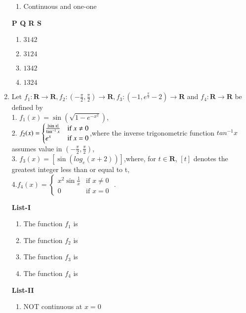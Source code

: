 \documentclass[journal,12pt,twocolumn]{IEEEtran}
\theoremstyle{remark}
\begin{document}
\begin{enumerate}
\begin{multicols}{2}
\begin{enumerate}[label=\arabic*.]
					\item  Continuous and one-one
				\end{enumerate}
		\end{multicols}
			\textbf{   P Q R S}
			\begin{enumerate}[label=(\alph*)]
				\item $ 3 1 4 2$
				\item$ 3 1 2 4$
				\item $1 3 4 2$ 
				\item $1 3 2 4$
			\end{enumerate}
            \item Let $f_1: \textbf{R}\to \textbf{R},f_2:(-\frac{\pi}{2},\frac{\pi}{2})\to \textbf{R}, f_3:(-1,e^\frac{\pi}{2}-2)\to \textbf{R}$ and $f_4: \textbf{R}\to \textbf{R}$ be defined by \\
            1. $f_1(x)=\sin({\sqrt{1-e^{-x^2}}})$, \\
            2. $f_2(x) =
             \begin{cases}
		 \frac{\left\vert\sin{x}\right\vert}{\tan^{-1}x} & \text{if } x \neq 0 \\
                 e^x & \text{if } x = 0 
                 \end{cases}$,where the inverse trigonometric function $tan^{-1}x $ assumes value in $(-\frac{\pi}{2},\frac{\pi}{2})$,\\
            3. $f_3(x)=[\sin({log_e(x+2)})]$,where, for $t\in \textbf{R}$, $[t]$ denotes the greatest integer less than or equal to t, \\
            4.$f_4(x) =
        \begin{cases}
                 x^2\sin{\frac{1}{x}} & \text{if } x \neq 0 \\
                 0 & \text{if } x = 0 
                 \end{cases}$ .
                 \begin{multicols}{2} 
				\textbf{List-I} 
				\begin{enumerate}[label=\Alph*., start=16]
					\item The function $f_1$ is
					\item The function $f_2$ is 
					\item The function $f_3$ is 
					\item The function $f_4$ is
				\end{enumerate}
				\columnbreak
				\textbf{List-II}
				\begin{enumerate}[label=\arabic*.]
					\item  NOT continuous at $x = 0$ 

\end{enumerate}
\end{multicols}
\end{enumerate}
\end{document}
